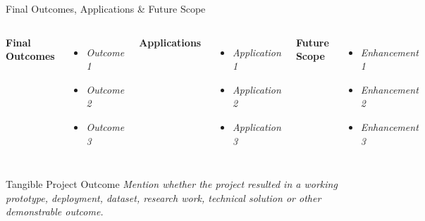 \documentclass[aspectratio=169,11pt]{beamer}
\newcommand{\placeholder}[1]{%
\textit{\color{GEUGrey}#1}
}
\begin{document}
\begin{frame}{Final Outcomes, Applications \& Future Scope}

\begin{columns}[T,totalwidth=\textwidth]


\textbf{\color{GEUBlue}Final Outcomes}

\begin{itemize}\itemsep3pt
    \item \placeholder{Outcome 1}
    \item \placeholder{Outcome 2}
    \item \placeholder{Outcome 3}
\end{itemize}


\textbf{\color{GEUBlue}Applications}

\begin{itemize}\itemsep3pt
    \item \placeholder{Application 1}
    \item \placeholder{Application 2}
    \item \placeholder{Application 3}
\end{itemize}


\textbf{\color{GEUBlue}Future Scope}

\begin{itemize}\itemsep3pt
    \item \placeholder{Enhancement 1}
    \item \placeholder{Enhancement 2}
    \item \placeholder{Enhancement 3}
\end{itemize}

\end{columns}

\vspace{5mm}

\begin{block}{Tangible Project Outcome}
\placeholder{
Mention whether the project resulted in a working prototype,
deployment, dataset, research work, technical solution or other
demonstrable outcome.
}
\end{block}

\end{frame}
\end{document}
